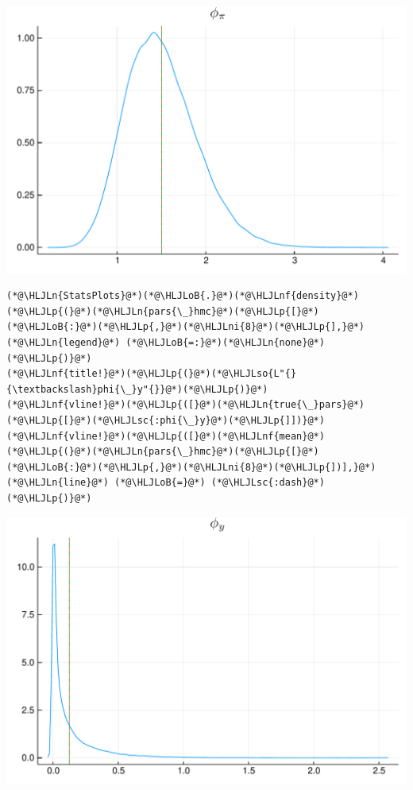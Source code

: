 \documentclass[12pt,a4paper]{article}
\newcommand{\HLJLn}[1]{#1}
\newcommand{\HLJLnf}[1]{\textcolor[RGB]{66,102,213}{#1}}
\newcommand{\HLJLsc}[1]{\textcolor[RGB]{201,61,57}{#1}}
\newcommand{\HLJLso}[1]{\textcolor[RGB]{201,61,57}{#1}}
\newcommand{\HLJLni}[1]{\textcolor[RGB]{59,151,46}{#1}}
\newcommand{\HLJLoB}[1]{\textcolor[RGB]{102,102,102}{\textbf{#1}}}
\newcommand{\HLJLp}[1]{#1}
\begin{document}
\includegraphics[width=\linewidth]{figures/dsge_and_julia_41_1.pdf}

\begin{lstlisting}
(*@\HLJLn{StatsPlots}@*)(*@\HLJLoB{.}@*)(*@\HLJLnf{density}@*)(*@\HLJLp{(}@*)(*@\HLJLn{pars{\_}hmc}@*)(*@\HLJLp{[}@*)(*@\HLJLoB{:}@*)(*@\HLJLp{,}@*)(*@\HLJLni{8}@*)(*@\HLJLp{],}@*) (*@\HLJLn{legend}@*) (*@\HLJLoB{=:}@*)(*@\HLJLn{none}@*)(*@\HLJLp{)}@*)
(*@\HLJLnf{title!}@*)(*@\HLJLp{(}@*)(*@\HLJLso{L"{}{\textbackslash}phi{\_}y"{}}@*)(*@\HLJLp{)}@*)
(*@\HLJLnf{vline!}@*)(*@\HLJLp{([}@*)(*@\HLJLn{true{\_}pars}@*)(*@\HLJLp{[}@*)(*@\HLJLsc{:phi{\_}y}@*)(*@\HLJLp{]])}@*)
(*@\HLJLnf{vline!}@*)(*@\HLJLp{([}@*)(*@\HLJLnf{mean}@*)(*@\HLJLp{(}@*)(*@\HLJLn{pars{\_}hmc}@*)(*@\HLJLp{[}@*)(*@\HLJLoB{:}@*)(*@\HLJLp{,}@*)(*@\HLJLni{8}@*)(*@\HLJLp{])],}@*) (*@\HLJLn{line}@*) (*@\HLJLoB{=}@*) (*@\HLJLsc{:dash}@*)(*@\HLJLp{)}@*)
\end{lstlisting}

\includegraphics[width=\linewidth]{figures/dsge_and_julia_42_1.pdf}
\end{document}
